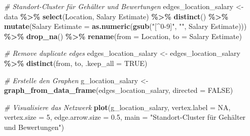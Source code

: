 \documentclass[
]{article}
\newenvironment{Shaded}{\begin{snugshade}}{\end{snugshade}}
\newcommand{\AttributeTok}[1]{\textcolor[rgb]{0.13,0.29,0.53}{#1}}
\newcommand{\CommentTok}[1]{\textcolor[rgb]{0.56,0.35,0.01}{\textit{#1}}}
\newcommand{\ConstantTok}[1]{\textcolor[rgb]{0.56,0.35,0.01}{#1}}
\newcommand{\DecValTok}[1]{\textcolor[rgb]{0.00,0.00,0.81}{#1}}
\newcommand{\FloatTok}[1]{\textcolor[rgb]{0.00,0.00,0.81}{#1}}
\newcommand{\FunctionTok}[1]{\textcolor[rgb]{0.13,0.29,0.53}{\textbf{#1}}}
\newcommand{\NormalTok}[1]{#1}
\newcommand{\OtherTok}[1]{\textcolor[rgb]{0.56,0.35,0.01}{#1}}
\newcommand{\SpecialCharTok}[1]{\textcolor[rgb]{0.81,0.36,0.00}{\textbf{#1}}}
\newcommand{\StringTok}[1]{\textcolor[rgb]{0.31,0.60,0.02}{#1}}
\begin{document}
\begin{Shaded}
\begin{Highlighting}[]
\CommentTok{\# Standort{-}Cluster für Gehälter und Bewertungen}
\NormalTok{edges\_location\_salary }\OtherTok{\textless{}{-}}\NormalTok{ data }\SpecialCharTok{\%\textgreater{}\%}
  \FunctionTok{select}\NormalTok{(Location, }\StringTok{\textasciigrave{}}\AttributeTok{Salary Estimate}\StringTok{\textasciigrave{}}\NormalTok{) }\SpecialCharTok{\%\textgreater{}\%}
  \FunctionTok{distinct}\NormalTok{() }\SpecialCharTok{\%\textgreater{}\%}
  \FunctionTok{mutate}\NormalTok{(}\StringTok{\textasciigrave{}}\AttributeTok{Salary Estimate}\StringTok{\textasciigrave{}} \OtherTok{=} \FunctionTok{as.numeric}\NormalTok{(}\FunctionTok{gsub}\NormalTok{(}\StringTok{"[\^{}0{-}9]"}\NormalTok{, }\StringTok{""}\NormalTok{, }\StringTok{\textasciigrave{}}\AttributeTok{Salary Estimate}\StringTok{\textasciigrave{}}\NormalTok{))) }\SpecialCharTok{\%\textgreater{}\%}
  \FunctionTok{drop\_na}\NormalTok{() }\SpecialCharTok{\%\textgreater{}\%}
  \FunctionTok{rename}\NormalTok{(}\AttributeTok{from =}\NormalTok{ Location, }\AttributeTok{to =} \StringTok{\textasciigrave{}}\AttributeTok{Salary Estimate}\StringTok{\textasciigrave{}}\NormalTok{)}

\CommentTok{\# Remove duplicate edges}
\NormalTok{edges\_location\_salary }\OtherTok{\textless{}{-}}\NormalTok{ edges\_location\_salary }\SpecialCharTok{\%\textgreater{}\%}
  \FunctionTok{distinct}\NormalTok{(from, to, }\AttributeTok{.keep\_all =} \ConstantTok{TRUE}\NormalTok{)}

\CommentTok{\# Erstelle den Graphen}
\NormalTok{g\_location\_salary }\OtherTok{\textless{}{-}} \FunctionTok{graph\_from\_data\_frame}\NormalTok{(edges\_location\_salary, }\AttributeTok{directed =} \ConstantTok{FALSE}\NormalTok{)}

\CommentTok{\# Visualisiere das Netzwerk}
\FunctionTok{plot}\NormalTok{(g\_location\_salary, }\AttributeTok{vertex.label =} \ConstantTok{NA}\NormalTok{, }\AttributeTok{vertex.size =} \DecValTok{5}\NormalTok{, }
     \AttributeTok{edge.arrow.size =} \FloatTok{0.5}\NormalTok{, }\AttributeTok{main =} \StringTok{"Standort{-}Cluster für Gehälter und Bewertungen"}\NormalTok{)}
\end{Highlighting}
\end{Shaded}
\end{document}
